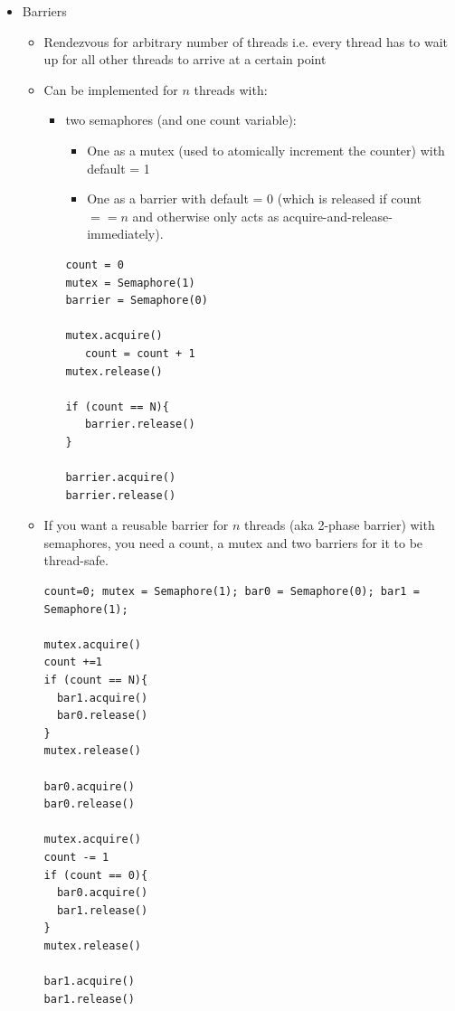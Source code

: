 \documentclass[a4paper]{article}
\begin{document}
\begin{itemize}
\item Barriers
\begin{itemize}
\item Rendezvous for arbitrary number of threads i.e. every thread has to wait up for all other threads to arrive at a certain point
\item Can be implemented for $n$ threads with:
\begin{itemize}
\item  two semaphores (and one count variable): 
\begin{itemize}
\item One as a mutex (used to atomically increment the counter) with default = 1 
\item One as a barrier with default = 0 (which is released if count $== n$ and otherwise only acts as acquire-and-release-immediately).
\end{itemize}

\begin{lstlisting}
count = 0
mutex = Semaphore(1)
barrier = Semaphore(0)

mutex.acquire()
   count = count + 1
mutex.release()

if (count == N){
   barrier.release()
}

barrier.acquire()
barrier.release()
\end{lstlisting}
\end{itemize}
\item If you want a reusable barrier for $n$ threads (aka 2-phase barrier) with semaphores, you need a count, a mutex and two barriers for it to be thread-safe.
\begin{lstlisting}
count=0; mutex = Semaphore(1); bar0 = Semaphore(0); bar1 = Semaphore(1);

mutex.acquire()
count +=1
if (count == N){
  bar1.acquire()
  bar0.release()
}
mutex.release()

bar0.acquire()
bar0.release()

mutex.acquire()
count -= 1
if (count == 0){
  bar0.acquire()
  bar1.release()
}
mutex.release()

bar1.acquire()
bar1.release()
\end{lstlisting}

\end{itemize}


\end{itemize}
\end{document}

